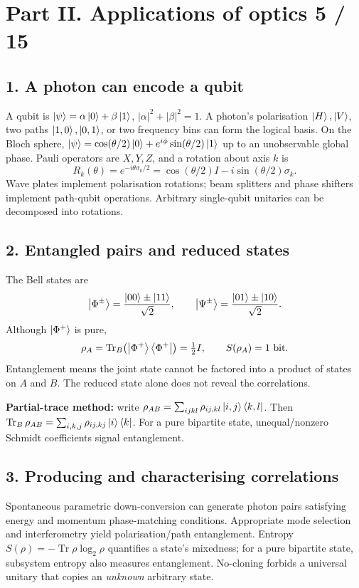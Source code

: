 
\section*{Part II. Applications of optics \hfill 5 / 15}
\subsection*{1. A photon can encode a qubit}
A qubit is \(\left\lvert \psi\right\rangle=\alpha\left\lvert 0\right\rangle+\beta\left\lvert 1\right\rangle\),
\(|\alpha|^2+|\beta|^2=1\). A photon's polarisation
\(\left\lvert H\right\rangle,\left\lvert V\right\rangle\), two paths \(\left\lvert 1,0\right\rangle,\left\lvert 0,1\right\rangle\),
or two frequency bins can form the logical basis.
On the Bloch sphere,
\(\left\lvert \psi\right\rangle=\cos(\theta/2)\left\lvert 0\right\rangle+e^{i\phi}\sin(\theta/2)\left\lvert 1\right\rangle\)
up to an unobservable global phase. Pauli operators are
\(X,Y,Z\), and a rotation about axis \(k\) is
\[
\boxed{R_k(\theta)=e^{-i\theta\sigma_k/2}
=\cos(\theta/2)I-i\sin(\theta/2)\sigma_k.}
\]
Wave plates implement polarisation rotations; beam splitters and
phase shifters implement path-qubit operations. Arbitrary
single-qubit unitaries can be decomposed into rotations.

\subsection*{2. Entangled pairs and reduced states}
The Bell states are
\[
\left\lvert \Phi^\pm\right\rangle=\frac{\left\lvert 00\right\rangle\pm\left\lvert 11\right\rangle}{\sqrt2},\qquad
\left\lvert \Psi^\pm\right\rangle=\frac{\left\lvert 01\right\rangle\pm\left\lvert 10\right\rangle}{\sqrt2}.
\]
Although \(\left\lvert \Phi^+\right\rangle\) is pure,
\[
\rho_A=\operatorname{Tr}_B\bigl(\left\lvert \Phi^+\right\rangle\left\langle \Phi^+\right\rvert\bigr)
=\tfrac12 I,\qquad S(\rho_A)=1\ \mathrm{bit}.
\]
Entanglement means the joint state cannot be factored
into a product of states on \(A\) and \(B\).
The reduced state alone does not reveal the correlations.

\begin{methodbox}
\textbf{Partial-trace method:} write
\(\rho_{AB}=\sum_{ijkl}\rho_{ij,kl}\left\lvert i,j\right\rangle\left\langle k,l\right\rvert\).
Then \(\operatorname{Tr}_B\rho_{AB}
=\sum_{i,k,j}\rho_{ij,kj}\left\lvert i\right\rangle\left\langle k\right\rvert\).
For a pure bipartite state, unequal/nonzero Schmidt coefficients
signal entanglement.
\end{methodbox}
\subsection*{3. Producing and characterising correlations}
Spontaneous parametric down-conversion can generate photon pairs
satisfying energy and momentum phase-matching conditions.
Appropriate mode selection and interferometry yield
polarisation/path entanglement. Entropy
\(S(\rho)=-\operatorname{Tr}\rho\log_2\rho\) quantifies
a state's mixedness; for a pure bipartite state, subsystem entropy
also measures entanglement. No-cloning forbids a universal
unitary that copies an \emph{unknown} arbitrary state.

